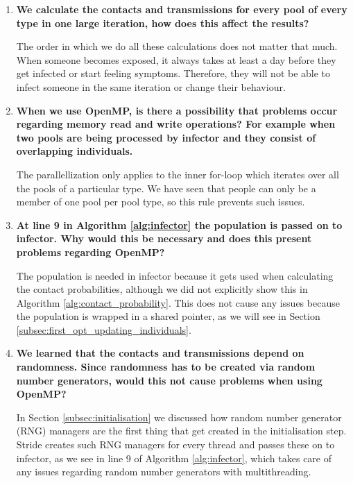 \begin{enumerate}
    \item \textbf{We calculate the contacts and transmissions for every pool of every type in one large iteration, how does this affect the results?}
    
    The order in which we do all these calculations does not matter that much. When someone becomes exposed, it always takes at least a day before they get infected or start feeling symptoms. Therefore, they will not be able to infect someone in the same iteration or change their behaviour.
    
    \item \textbf{When we use OpenMP, is there a possibility that problems occur regarding memory read and write operations? For example when two pools are being processed by infector and they consist of overlapping individuals.}
    
    The parallellization only applies to the inner for-loop which iterates over all the pools of a particular type. We have seen that people can only be a member of one pool per pool type, so this rule prevents such issues.
    
    \item \textbf{At line 9 in Algorithm \ref{alg:infector} the population is passed on to infector. Why would this be necessary and does this present problems regarding OpenMP?}
    
    The population is needed in infector because it gets used when calculating the contact probabilities, although we did not explicitly show this in Algorithm \ref{alg:contact_probability}. This does not cause any issues because the population is wrapped in a shared pointer, as we will see in Section \ref{subsec:first_opt_updating_individuals}.
    
    \item \textbf{We learned that the contacts and transmissions depend on randomness. Since randomness has to be created via random number generators, would this not cause problems when using OpenMP?}
    
    In Section \ref{subsec:initialisation} we discussed how random number generator (RNG) managers are the first thing that get created in the initialisation step. Stride creates such RNG managers for every thread and passes these on to infector, as we see in line 9 of Algorithm \ref{alg:infector}, which takes care of any issues regarding random number generators with multithreading.
\end{enumerate}

